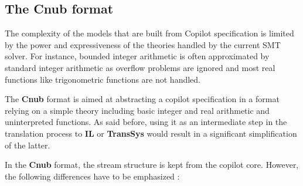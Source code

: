 



\subsection{The \textbf{Cnub} format}

The complexity of the models that are built from Copilot specification is limited by the power and expressiveness of the theories handled by the current SMT solver. For instance, bounded integer arithmetic is often approximated by standard integer arithmetic as overflow problems are ignored and most real functions like trigonometric functions are not handled.

The \textbf{Cnub} format is aimed at abstracting a copilot specification in a format relying on a simple theory including basic integer and real arithmetic and uninterpreted functions. As said before, using it as an intermediate step in the translation process to \textbf{IL} or \textbf{TransSys} would result in a significant simplification of the latter.


In the \textbf{Cnub} format, the stream structure is kept from the copilot core. However, the following differences have to be emphasized :

